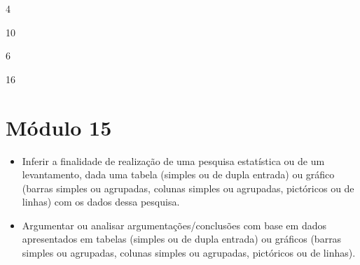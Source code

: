 \begin{escolha}
\item
  4
\item
  10
\item
  6
\item
  16
\end{escolha}


\chapter{Módulo 15}


\begin{itemize}
\item Inferir a finalidade de realização de uma pesquisa estatística ou de
um levantamento, dada uma tabela (simples ou de dupla entrada) ou
gráfico (barras simples ou agrupadas, colunas simples ou agrupadas,
pictóricos ou de linhas) com os dados dessa pesquisa.

\item Argumentar ou analisar argumentações/conclusões com base em dados
apresentados em tabelas (simples ou de dupla entrada) ou gráficos
(barras simples ou agrupadas, colunas simples ou agrupadas, pictóricos
ou de linhas).
\end{itemize}


